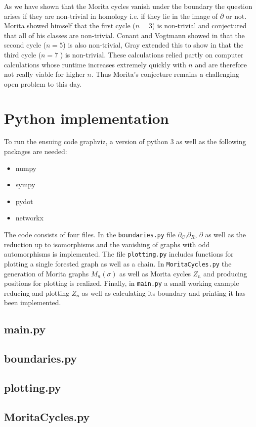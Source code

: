 As we have shown that the Morita cycles vanish under the boundary the question arises if they are
non-trivial in homology i.e. if they lie in the image of $\partial$ or not. 
Morita showed himself that the first cycle ($n=3$) is non-trivial and conjectured that 
all of his classes are non-trivial. Conant and Vogtmann showed in \cite{conant04} that 
the second cycle ($n=5$) is also non-trivial, Gray extended this
to show in \cite{gray11} that the third cycle ($n=7$ ) is non-trivial.
These calculations relied partly on computer calculations
whose runtime increases extremely quickly with $n$ and are therefore not really viable for higher $n$. Thus Morita's conjecture
remains a challenging open problem to this day.

\newpage
\printbibliography
\newpage
\appendix
\section{Python implementation}
To run the ensuing code graphviz, a version of python 3 as well as the following packages are needed:
\begin{itemize}
	\item numpy
	\item sympy
	\item pydot
	\item networkx
\end{itemize}
The code consists of four files.
In the \texttt{boundaries.py} file $\partial_{C}$,$\partial_{R}$, $\partial$ as well as
the reduction up to isomorphisms and the vanishing of graphs with odd automorphisms is implemented.
The file \texttt{plotting.py} includes functions for plotting a single forested graph as well as a chain.
In \texttt{MoritaCycles.py} the generation of Morita graphs $M_{n}(\sigma)$ as well as
Morita cycles $Z_{n}$ and producing positions for plotting is realized.
Finally, in \texttt{main.py} a small working example reducing and plotting $Z_{n}$ as well as calculating
its boundary and printing it has been implemented.

\subsection{main.py}

\subsection{boundaries.py}

\subsection{plotting.py}

\subsection{MoritaCycles.py}


%


